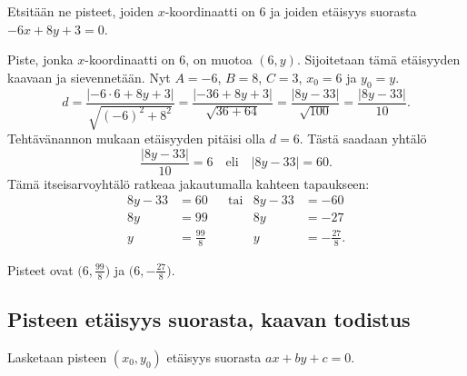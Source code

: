 \begin{esimerkki} Etsitään ne pisteet, joiden $x$-koordinaatti on 6 ja joiden etäisyys suorasta $-6x+8y+3=0$.
\begin{esimratk}
Piste, jonka $x$-koordinaatti on 6, on muotoa $(6,y)$. Sijoitetaan tämä etäisyyden kaavaan ja sievennetään.
Nyt $A=-6$, $B=8$, $C=3$, $x_0=6$ ja $y_0=y$.
\[
d=\frac{|-6\cdot 6+8y+3|}{\sqrt{(-6)^2+8^2}}
=\frac{|-36+8y+3|}{\sqrt{36+64}}
=\frac{|8y-33|}{\sqrt{100}}
=\frac{|8y-33|}{10}.
\]
Tehtävänannon mukaan etäisyyden pitäisi olla $d=6$. Tästä saadaan yhtälö
\[
\frac{|8y-33|}{10}=6 \quad \text{eli} \quad |8y-33|=60.
\]
Tämä itseisarvoyhtälö ratkeaa jakautumalla kahteen tapaukseen:
\begin{align*}
8y-33 & =60 & &\text{tai} & 8y-33 & =-60 \\
8y & =99 & & & 8y & =-27 \\
y & =\frac{99}{8} & & & y & =-\frac{27}{8}.
\end{align*}
\end{esimratk}
\begin{esimvast}
Pisteet ovat $\bigl(6, \frac{99}{8}\bigr)$ ja $\bigl(6, -\frac{27}{8}\bigr)$.
\end{esimvast}
\end{esimerkki}



\subsection*{Pisteen etäisyys suorasta, kaavan todistus}

Lasketaan pisteen $(x_0, y_0)$ etäisyys suorasta $ax+by+c=0$.

